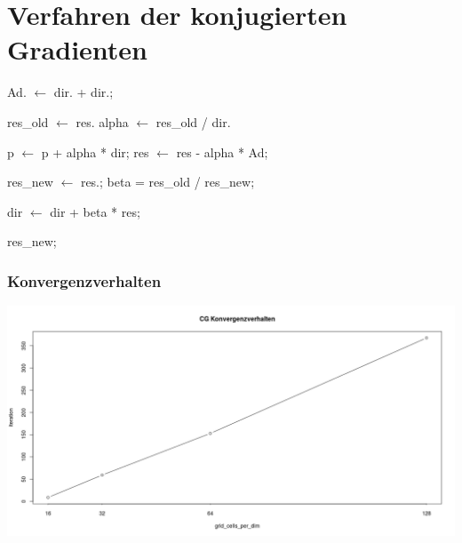 \documentclass[]{beamer}
\begin{document}
\section{Verfahren der konjugierten Gradienten}
\begin{frame}
  \begin{algorithmic}
     \State Ad. $\gets$ dir. + dir.;
    \EndFor

    \State res\_old $\gets$ res.
    \State alpha $\gets $ res\_old / dir.


     \State p $\gets$ p + alpha * dir;
     \State res $\gets$ res - alpha * Ad;


    \State res\_new $\gets$ res.;
    \State beta = res\_old / res\_new;

    \State dir $\gets$ dir + beta * res;

    \State \Return res\_new;
    \EndFunction
  \end{algorithmic}
\end{frame}



\begin{frame}
\frametitle{Konvergenzverhalten}
\begin{center}
\includegraphics[scale=0.22]{CG_Konvergenzverhalten.png}
\end{center}
\end{frame}
\end{document}
